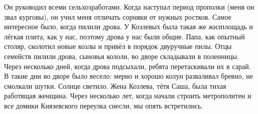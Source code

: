 \label{156-1}
Он руководил всеми сельхозработами. Когда наступал период прополки (меня он звал курговы), он учил меня отличать сорняки от нужных ростков. Самое интересное было, когда пилили дрова. У Козлевых была такая же жилплощадь и лёгкая плита, как у нас, поэтому дрова у нас были общие. Папа, как опытный столяр, сколотил новые козлы и привёл в порядок двуручные пилы. Отцы семейств пилили дрова, сыновья кололи, во дворе складывали в поленницы. Через несколько дней, когда дрова подсыхали, ребята перетаскивали их в сарай. В такие дни во дворе было весело: мерно и хорошо колун разваливал бревно, не смолкали шутки. Солнце светило. Жена Козлева, тётя Саша, была тихая работящая женщина. Через несколько лет, когда начали строить метрополитен и все домики Князевского переулка снесли, мы опять встретились.